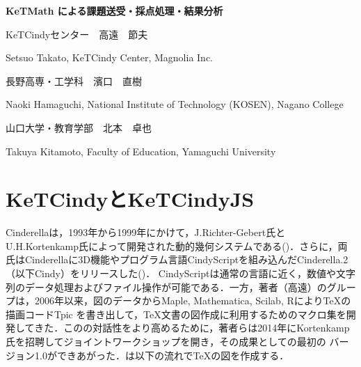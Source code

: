 \documentclass[a4j,12pt]{ujarticle}
\begin{document}
\begin{center}

{\bf \Large KeTMath による課題送受・採点処理・結果分析}

\end{center}

\mbox{}

\begin{center}

KeTCindyセンター　高遠　節夫

Setsuo Takato, KeTCindy Center, Magnolia Inc.


長野高専・工学科　濱口　直樹

Naoki Hamaguchi, National Institute of Technology (KOSEN), Nagano College

山口大学・教育学部　北本　卓也

Takuya Kitamoto, Faculty of Education, Yamaguchi University

\end{center}

\section{KeTCindyとKeTCindyJS}

Cinderellaは，1993年から1999年にかけて，J.Richter-Gebert氏とU.H.Kortenkamp氏によって開発された動的幾何システムである(\cite{Cinderella1})．さらに，両氏はCinderellaに3D機能やプログラム言語CindyScriptを組み込んだCinderella.2（以下Cindy）をリリースした(\cite{Cinderella2})．
CindyScriptは通常の言語に近く，数値や文字列のデータ処理およびファイル操作が可能である．一方，著者（高遠）のグループは，2006年以来，図のデータからMaple, Mathematica, Scilab, Rにより\TeX の描画コードTpic を書き出して，\TeX 文書の図作成に利用するためのマクロ集\ketpic を開発してきた．この\ketpic の対話性をより高めるために，著者らは2014年にKortenkamp氏を招聘してジョイントワークショップを開き，その成果として\ketcindy の最初の
バージョン1.0ができあがった．\ketcindy は以下の流れで\TeX の図を作成する．\vspace{-2mm}
\end{document}
